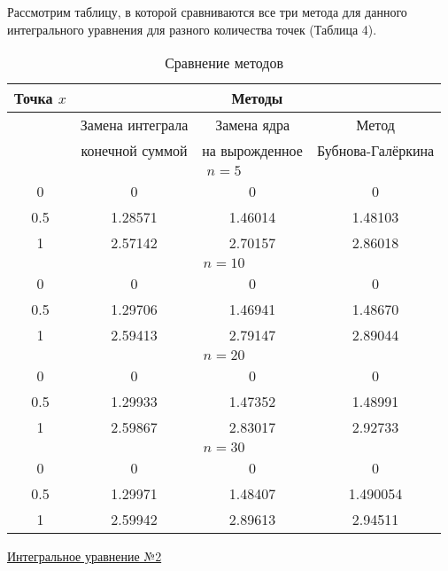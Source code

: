 \documentclass[12pt]{article}
\begin{document}
Рассмотрим таблицу, в которой сравниваются все три метода для данного интегрального уравнения для разного количества точек (Таблица 4).\\

\newpage

\renewcommand{\arraystretch}{1.5} %
\renewcommand{\tabcolsep}{0.1cm}   %

\begin{table}[h!]
	\caption{\label{tab:canonsummary} Сравнение методов}
	\begin{center}
		\begin{tabular}{|c|c|c|c|}
			\hline
			Точка $ x $ & \multicolumn{3}{|c|}{Методы} \\
			\hline
			 & Замена интеграла& Замена ядра& Метод\\
			 & конечной суммой & на вырожденное & Бубнова-Галёркина\\			 
			\hline
			\multicolumn{4}{|c|}{$ n = 5 $} \\
			\hline
			0 & 0 & 0 & 0 \\
			\hline
			0.5 & 1.28571& 1.46014 & 1.48103 \\
			\hline
			1 & 2.57142 & 2.70157 & 2.86018 \\
			\hline
			\multicolumn{4}{|c|}{$ n = 10 $} \\
			\hline
			0 & 0 & 0 & 0 \\
			\hline
			0.5 & 1.29706 & 1.46941 & 1.48670 \\
			\hline
			1 & 2.59413 & 2.79147 & 2.89044 \\
			\hline
			\multicolumn{4}{|c|}{$ n = 20 $} \\
			\hline
			0 & 0 & 0 & 0 \\
			\hline
			0.5 & 1.29933 & 1.47352 & 1.48991 \\
			\hline
			1 & 2.59867 & 2.83017 & 2.92733 \\
			\hline
			\multicolumn{4}{|c|}{$ n = 30 $} \\
			\hline
			0 & 0 & 0 & 0 \\
			\hline
			0.5 & 1.29971 & 1.48407 & 1.490054 \\
			\hline
			1 & 2.59942 & 2.89613 & 2.94511 \\						
			\hline
		\end{tabular}
	\end{center}
\end{table} 

\newpage
\begin{center}
	\underline{Интегральное уравнение №2}
\end{center}
\end{document}

